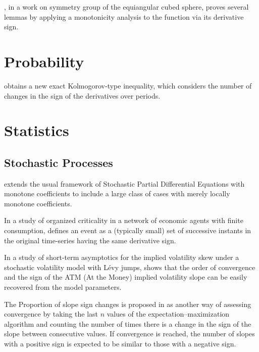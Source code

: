 \documentclass[11pt]{book}
\begin{document}
\cite{bellet2020symmetry}, in a work on symmetry group of the equiangular cubed sphere, proves several lemmas by applying a monotonicity
analysis to the function via its derivative sign.


\section{Probability}

\cite{kofanov2003kolmogorov} obtains a new exact Kolmogorov-type
inequality, which considers the number of changes in the sign of the
derivatives over periods.


\section{Statistics}


\subsection{Stochastic Processes}

\cite{liu2010spde} extends the usual framework of
Stochastic Partial Differential Equations with monotone coefficients to include a large class of cases
with merely locally monotone coefficients.

In a study of organized criticality in a network of economic
agents with finite consumption, \cite{da2012self} defines an event as a (typically small)
set of successive instants in the original time-series having the
same derivative sign.

In a study of short-term asymptotics for the implied
volatility skew under a stochastic volatility model with Lévy jumps, \cite{figueroa2016short} shows that the order of convergence and the sign of the ATM (At the Money) implied volatility
slope can be easily recovered from the
model parameters.

The \textquotedbl Proportion of slope sign changes\textquotedbl{} is
proposed in \cite{duchen2017inference} as another way of assessing
convergence by taking the last $n$ values of the expectation–maximization algorithm and
counting the number of times there is a change in the sign of the
slope between consecutive values. If convergence is reached, the number
of slopes with a positive sign is expected to be similar to those
with a negative sign.
\end{document}
